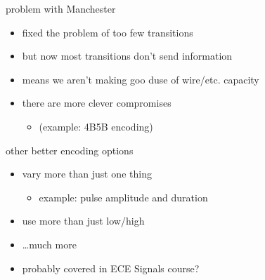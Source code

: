\begin{frame}{problem with Manchester}
    \begin{itemize}
    \item fixed the problem of too few transitions
    \vspace{.5cm}
    \item but now most transitions don't send information
    \item means we aren't making goo duse of wire/etc. capacity
    \vspace{.5cm}
    \item there are more clever compromises
        \begin{itemize}
        \item (example: 4B5B encoding)
        \end{itemize}
    \end{itemize}
\end{frame}

\begin{frame}{other better encoding options}
    \begin{itemize}
    \item vary more than just one thing
        \begin{itemize}
        \item example: pulse amplitude and duration
        \end{itemize}
    \item use more than just low/high
    \item \ldots much more
    \vspace{.5cm}
    \item probably covered in ECE Signals course?
    \end{itemize}
\end{frame}
